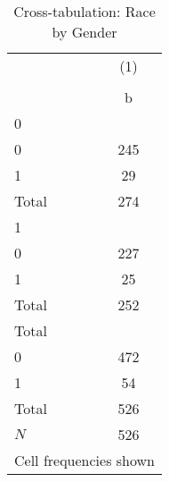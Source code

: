\begin{table}[htbp]\centering
\def\sym#1{\ifmmode^{#1}\else\(^{#1}\)\fi}
\caption{Cross-tabulation: Race by Gender}
\begin{tabular}{l*{1}{c}}
\toprule
            &\multicolumn{1}{c}{(1)}\\
            &\multicolumn{1}{c}{}\\
            &           b\\
\midrule
0           &            \\
0           &         245\\
1           &          29\\
Total       &         274\\
\midrule
1           &            \\
0           &         227\\
1           &          25\\
Total       &         252\\
\midrule
Total       &            \\
0           &         472\\
1           &          54\\
Total       &         526\\
\midrule
\(N\)       &         526\\
\bottomrule
\multicolumn{2}{l}{\footnotesize Cell frequencies shown}\\
\end{tabular}
\end{table}
